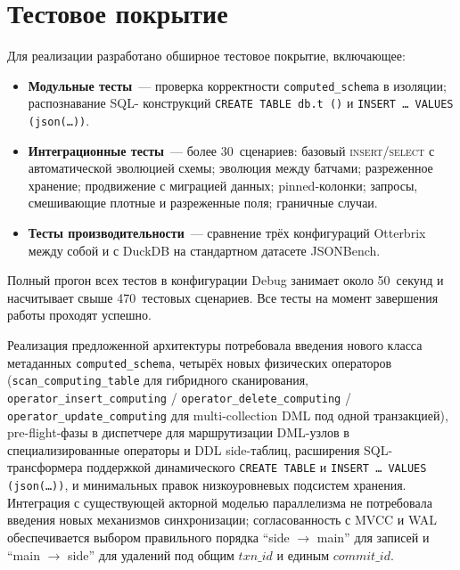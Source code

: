 \section{Тестовое покрытие}

Для реализации разработано обширное тестовое покрытие, включающее:

\begin{itemize}
    \item \textbf{Модульные тесты}~--- проверка корректности
    \texttt{computed\_schema} в изоляции; распознавание SQL-
    конструкций \texttt{CREATE TABLE db.t~()} и
    \texttt{INSERT \ldots\ VALUES (json(\ldots))}.
    \item \textbf{Интеграционные тесты}~--- более 30~сценариев:
    базовый \textsc{insert}/\textsc{select} с автоматической
    эволюцией схемы; эволюция между батчами; разреженное хранение;
    продвижение с миграцией данных; pinned-колонки; запросы,
    смешивающие плотные и разреженные поля; граничные случаи.
    \item \textbf{Тесты производительности}~--- сравнение трёх
    конфигураций Otterbrix между собой и с DuckDB на стандартном
    датасете JSONBench.
\end{itemize}

Полный прогон всех тестов в конфигурации Debug занимает около
50~секунд и насчитывает свыше 470~тестовых сценариев. Все тесты на
момент завершения работы проходят успешно.

\chapterconclusion

Реализация предложенной архитектуры потребовала введения нового
класса метаданных \texttt{computed\_schema}, четырёх новых
физических операторов (\texttt{scan\_computing\_table} для
гибридного сканирования, \texttt{operator\_insert\_computing} /
\texttt{operator\_delete\_computing} /
\texttt{operator\_update\_computing} для multi-collection DML под
одной транзакцией), pre-flight-фазы в диспетчере для маршрутизации
DML-узлов в специализированные операторы и DDL side-таблиц,
расширения SQL-трансформера поддержкой динамического
\texttt{CREATE TABLE} и \texttt{INSERT \ldots\ VALUES
(json(\ldots))}, и минимальных правок низкоуровневых подсистем
хранения. Интеграция с существующей акторной моделью параллелизма
не потребовала введения новых механизмов синхронизации; согласованность
с MVCC и WAL обеспечивается выбором правильного порядка
``side $\to$ main'' для записей и ``main $\to$ side'' для удалений
под общим $\mathit{txn\_id}$ и единым $\mathit{commit\_id}$.
